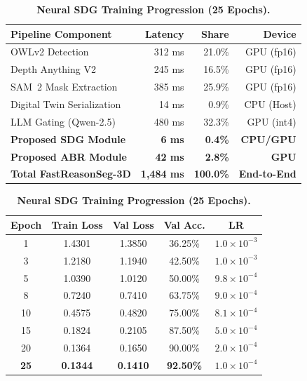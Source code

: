 \documentclass[10pt,twocolumn,letterpaper]{article}
\begin{document}
\begin{table}[t]
\centering
\begin{minipage}[t]{0.48\textwidth}
\centering
\footnotesize
\caption{\textbf{Component-by-Component Latency Breakdown on RTX 4050.}}
\label{tab:latency}
\begin{tabular*}{\linewidth}{@{\extracolsep{\fill}}lrrr}
\toprule
\textbf{Pipeline Component} & \textbf{Latency} & \textbf{Share} & \textbf{Device} \\
\midrule
OWLv2 Detection~\cite{minderer2024scaling} & 312 ms & 21.0\% & GPU (fp16) \\
Depth Anything V2~\cite{yang2024depthanything} & 245 ms & 16.5\% & GPU (fp16) \\
SAM~2 Mask Extraction~\cite{ravi2024sam2} & 385 ms & 25.9\% & GPU (fp16) \\
Digital Twin Serialization & 14 ms & 0.9\% & CPU (Host) \\
LLM Gating (Qwen-2.5)~\cite{yang2024qwen2} & 480 ms & 32.3\% & GPU (int4) \\
\midrule
\textbf{Proposed SDG Module} & \textbf{6 ms} & \textbf{0.4\%} & \textbf{CPU/GPU} \\
\textbf{Proposed ABR Module} & \textbf{42 ms} & \textbf{2.8\%} & \textbf{GPU} \\
\midrule
\textbf{Total FastReasonSeg-3D} & \textbf{1,484 ms} & \textbf{100.0\%} & \textbf{End-to-End} \\
\bottomrule
\end{tabular*}
\end{minipage}
\hfill
\begin{minipage}[t]{0.48\textwidth}
\centering
\footnotesize
\caption{\textbf{Neural SDG Training Progression (25 Epochs).}}
\label{tab:training}
\begin{tabular*}{\linewidth}{@{\extracolsep{\fill}}ccccc}
\toprule
\textbf{Epoch} & \textbf{Train Loss} & \textbf{Val Loss} & \textbf{Val Acc.} & \textbf{LR} \\
\midrule
1 & 1.4301 & 1.3850 & 36.25\% & $1.0\times 10^{-3}$ \\
3 & 1.2180 & 1.1940 & 42.50\% & $1.0\times 10^{-3}$ \\
5 & 1.0390 & 1.0120 & 50.00\% & $9.8\times 10^{-4}$ \\
8 & 0.7240 & 0.7410 & 63.75\% & $9.0\times 10^{-4}$ \\
10 & 0.4575 & 0.4820 & 75.00\% & $8.1\times 10^{-4}$ \\
15 & 0.1824 & 0.2105 & 87.50\% & $5.0\times 10^{-4}$ \\
20 & 0.1364 & 0.1650 & 90.00\% & $2.0\times 10^{-4}$ \\
\textbf{25} & \textbf{0.1344} & \textbf{0.1410} & \textbf{92.50\%} & \textbf{$1.0\times 10^{-4}$} \\
\bottomrule
\end{tabular*}
\end{minipage}
\end{table}
\end{document}
